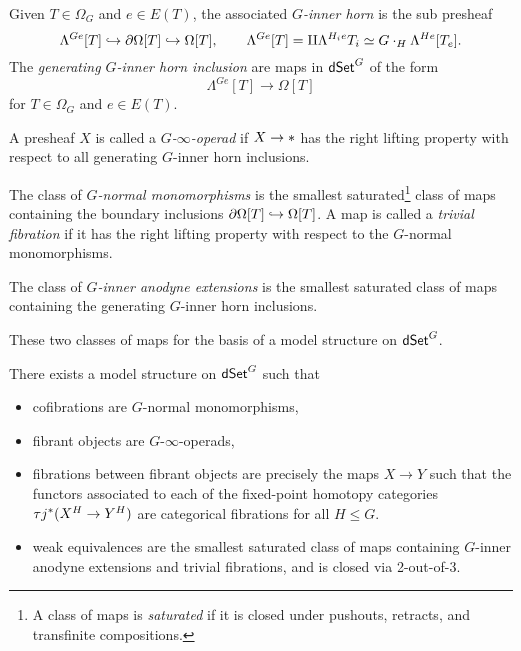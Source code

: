 \documentclass[a4paper,10pt
,draft
]{article}%
\renewcommand{\1}{\eta}%
\begin{document}
\begin{definition}
      Given $T \in \Omega_G$ and $e \in E(T)$, the associated \textit{$G$-inner horn} is the sub presheaf
      \[
            \Lambda^{Ge}[T] \hookrightarrow \partial \Omega[T] \hookrightarrow \Omega[T],
            \qquad
            \Lambda^{Ge}[T] = \amalg \Lambda^{H_i e}{T_i} \simeq G \cdot_H \Lambda^{He}[T_e].
      \]
      The \textit{generating $G$-inner horn inclusion} are maps in $\mathsf{dSet}^G$ of the form
      \[
            \Lambda^{Ge}[T] \to \Omega[T]
      \]
      for $T \in \Omega_G$ and $e \in E(T)$.

      A presheaf $X$ is called a \textit{$G$-$\infty$-operad} if $X \to \**$ has the right lifting property with respect to all generating $G$-inner horn inclusions.
\end{definition}

\begin{definition}
      The class of \textit{$G$-normal monomorphisms}
      is the smallest saturated\footnote{
        A class of maps is \textit{saturated} if it is closed under pushouts, retracts, and transfinite compositions.}
      class of maps containing the boundary inclusions $\partial \Omega[T] \hookrightarrow \Omega[T]$.
      A map is called a \textit{trivial fibration} if it has the right lifting property with respect to the $G$-normal monomorphisms.
      
      The class of \textit{$G$-inner anodyne extensions} is the smallest saturated class of maps containing the generating $G$-inner horn inclusions.
\end{definition}

These two classes of maps for the basis of a model structure on $\mathsf{dSet}^G$.

\begin{theorem}
      There exists a model structure on $\mathsf{dSet}^G$ such that
      \begin{itemize}
      \item cofibrations are $G$-normal monomorphisms,
      \item fibrant objects are $G$-$\infty$-operads,
      \item fibrations between fibrant objects are precisely the maps $X \to Y$ such that the functors associated to each of the fixed-point homotopy categories $\tau j^{\**}(X^H \to Y^H)$ are categorical fibrations for all $H \leq G$.
      \item weak equivalences are the smallest saturated class of maps containing $G$-inner anodyne extensions and trivial fibrations, and is closed via 2-out-of-3.
      \end{itemize}
\end{theorem}
\end{document}
